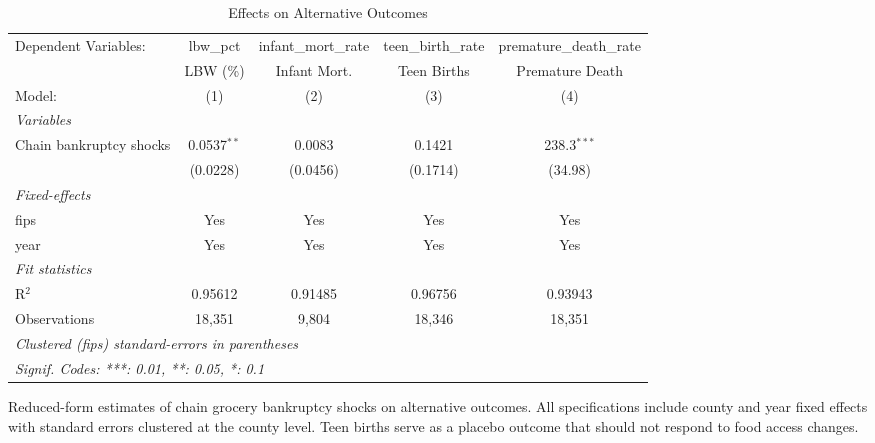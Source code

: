 
\begin{table}[htbp]
   \caption{\label{tab:placebo} Effects on Alternative Outcomes}
   \centering
   \begin{adjustbox}{max width=\textwidth}
   \begin{tabular}{lcccc}
      \tabularnewline \midrule \midrule
      Dependent Variables:    & lbw\_pct      & infant\_mort\_rate   & teen\_birth\_rate   & premature\_death\_rate\\    
                              & LBW (\%)      & Infant Mort.         & Teen Births         & Premature Death \\   
      Model:                  & (1)           & (2)                  & (3)                 & (4)\\  
      \midrule
      \emph{Variables}\\
      Chain bankruptcy shocks & 0.0537$^{**}$ & 0.0083               & 0.1421              & 238.3$^{***}$\\   
                              & (0.0228)      & (0.0456)             & (0.1714)            & (34.98)\\   
      \midrule
      \emph{Fixed-effects}\\
      fips                    & Yes           & Yes                  & Yes                 & Yes\\  
      year                    & Yes           & Yes                  & Yes                 & Yes\\  
      \midrule
      \emph{Fit statistics}\\
      R$^2$                   & 0.95612       & 0.91485              & 0.96756             & 0.93943\\  
      Observations            & 18,351        & 9,804                & 18,346              & 18,351\\  
      \midrule \midrule
      \multicolumn{5}{l}{\emph{Clustered (fips) standard-errors in parentheses}}\\
      \multicolumn{5}{l}{\emph{Signif. Codes: ***: 0.01, **: 0.05, *: 0.1}}\\
   \end{tabular}
   \end{adjustbox}
   
   \par \raggedright 
   Reduced-form estimates of chain grocery bankruptcy shocks on alternative outcomes. All specifications include county and year fixed effects with standard errors clustered at the county level. Teen births serve as a placebo outcome that should not respond to food access changes.
\end{table}


